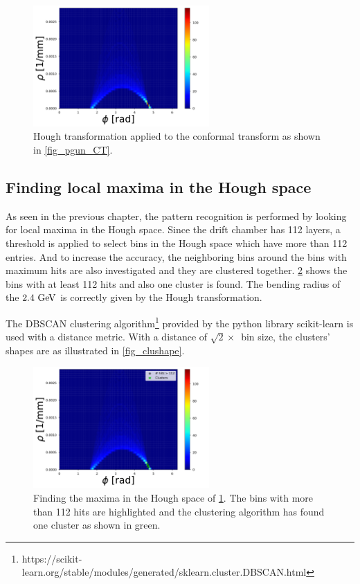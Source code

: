 \begin{figure}[ht]
	\centering
	\includegraphics[width=0.6\textwidth]{figures/HT_pgun.pdf}%
	\caption{Hough transformation applied to the conformal transform as shown in \cref{fig_pgun_CT}.}
	\label{fig_pgun_HT}
\end{figure}

\subsection{Finding local maxima in the Hough space}
As seen in the previous chapter, the pattern recognition is performed by looking for local maxima in the Hough space. Since the drift chamber has 112 layers, a threshold is applied to select bins in the Hough space which have more than 112 entries. And to increase the accuracy, the neighboring bins around the bins with maximum hits are also investigated and they are clustered together. \cref{fig_pgun_HT_maxima} shows the bins with at least 112 hits and also one cluster is found. The bending radius of the $2.4\,\mathrm{\,Ge\kern -0.1em V}$ is correctly given by the Hough transformation.

The DBSCAN clustering algorithm\footnote{https://scikit-learn.org/stable/modules/generated/sklearn.cluster.DBSCAN.html} provided by the python library scikit-learn is used with a distance metric. With a distance of $\sqrt{2} \times$~bin size, the clusters' shapes are as illustrated in \cref{fig_clushape}.

\begin{figure}[ht]
	\centering
	\includegraphics[width=0.6\textwidth]{figures/HT_pgun_maxima.pdf}%
	\caption{Finding the maxima in the Hough space of \cref{fig_pgun_HT}. The bins with more than 112 hits are highlighted and the clustering algorithm has found one cluster as shown in green.}
	\label{fig_pgun_HT_maxima}
\end{figure}



